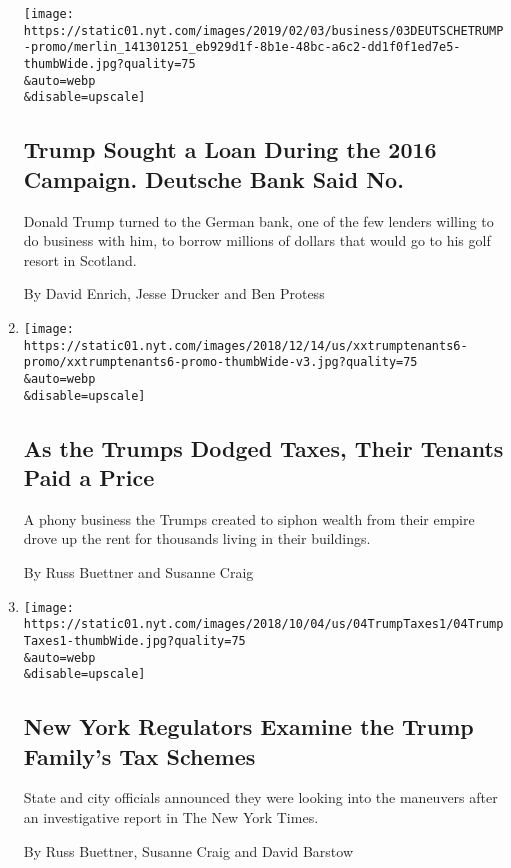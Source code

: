 \begin{enumerate}
  \texttt{[image: https://static01.nyt.com/images/2019/02/03/business/03DEUTSCHETRUMP-promo/merlin\_141301251\_eb929d1f-8b1e-48bc-a6c2-dd1f0f1ed7e5-thumbWide.jpg?quality=75\\\&auto=webp\\\&disable=upscale]}

  \hypertarget{trump-sought-a-loan-during-the-2016-campaign-deutsche-bank-said-no}{%
  \subsection{Trump Sought a Loan During the 2016 Campaign. Deutsche
  Bank Said
  No.}\label{trump-sought-a-loan-during-the-2016-campaign-deutsche-bank-said-no}}

  Donald Trump turned to the German bank, one of the few lenders willing
  to do business with him, to borrow millions of dollars that would go
  to his golf resort in Scotland.

  By David Enrich, Jesse Drucker and Ben Protess
\item
  \href{/2018/12/15/us/politics/trump-tenants-taxes.html}{}

  \texttt{[image: https://static01.nyt.com/images/2018/12/14/us/xxtrumptenants6-promo/xxtrumptenants6-promo-thumbWide-v3.jpg?quality=75\\\&auto=webp\\\&disable=upscale]}

  \hypertarget{as-the-trumps-dodged-taxes-their-tenants-paid-a-price}{%
  \subsection{As the Trumps Dodged Taxes, Their Tenants Paid a
  Price}\label{as-the-trumps-dodged-taxes-their-tenants-paid-a-price}}

  A phony business the Trumps created to siphon wealth from their empire
  drove up the rent for thousands living in their buildings.

  By Russ Buettner and Susanne Craig
\item
  \href{/2018/10/04/us/politics/donald-trump-fred-trump-tax-schemes.html}{}

  \texttt{[image: https://static01.nyt.com/images/2018/10/04/us/04TrumpTaxes1/04TrumpTaxes1-thumbWide.jpg?quality=75\\\&auto=webp\\\&disable=upscale]}

  \hypertarget{new-york-regulators-examine-the-trump-familys-tax-schemes}{%
  \subsection{New York Regulators Examine the Trump Family's Tax
  Schemes}\label{new-york-regulators-examine-the-trump-familys-tax-schemes}}

  State and city officials announced they were looking into the
  maneuvers after an investigative report in The New York Times.

  By Russ Buettner, Susanne Craig and David Barstow
\end{enumerate}

